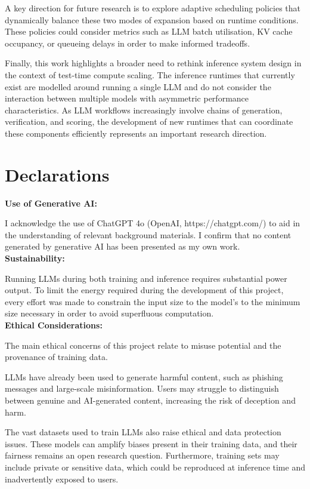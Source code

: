 \documentclass[12pt,twoside]{report}
\begin{document}
A key direction for future research is to explore adaptive scheduling policies that dynamically balance these two modes of expansion based on runtime conditions.
These policies could consider metrics such as LLM batch utilisation, KV cache occupancy, or queueing delays in order to make informed tradeoffs.

Finally, this work highlights a broader need to rethink inference system design in the context of test-time compute scaling.
The inference runtimes that currently exist are modelled around running a single LLM and do not consider the interaction between multiple models with asymmetric performance characteristics.
As LLM workflows increasingly involve chains of generation, verification, and scoring, the development of new runtimes that can coordinate these components efficiently represents an important research direction.




\chapter{Declarations}
\textbf{Use of Generative AI:} 

I acknowledge the use of ChatGPT 4o (OpenAI, https://chatgpt.com/) to aid in the understanding of relevant background materials. 
I confirm that no content generated by generative AI has been presented as my own work. \\

\textbf{Sustainability:} 

Running LLMs during both training and inference requires substantial power output.
To limit the energy required during the development of this project, every effort was made to constrain the input size to the model's to the minimum size necessary in order to avoid superfluous computation. \\

\textbf{Ethical Considerations:}

The main ethical concerns of this project relate to misuse potential and the provenance of training data.

LLMs have already been used to generate harmful content, such as phishing messages and large-scale misinformation. 
Users may struggle to distinguish between genuine and AI-generated content, increasing the risk of deception and harm.

The vast datasets used to train LLMs also raise ethical and data protection issues. 
These models can amplify biases present in their training data, and their fairness remains an open research question. 
Furthermore, training sets may include private or sensitive data, which could be reproduced at inference time and inadvertently exposed to users.
\end{document}

